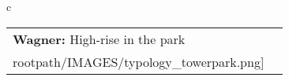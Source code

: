 \begin{table}[H]
        \begin{tabular}{c}
        \begin{tabular}{m{1.5in} m{2in}}
\textbf{Wagner:} {High-rise in the park} & \texttt{[image: \\rootpath/IMAGES/typology\_towerpark.png]}
\end{tabular}\end{tabular}
        \end{table}